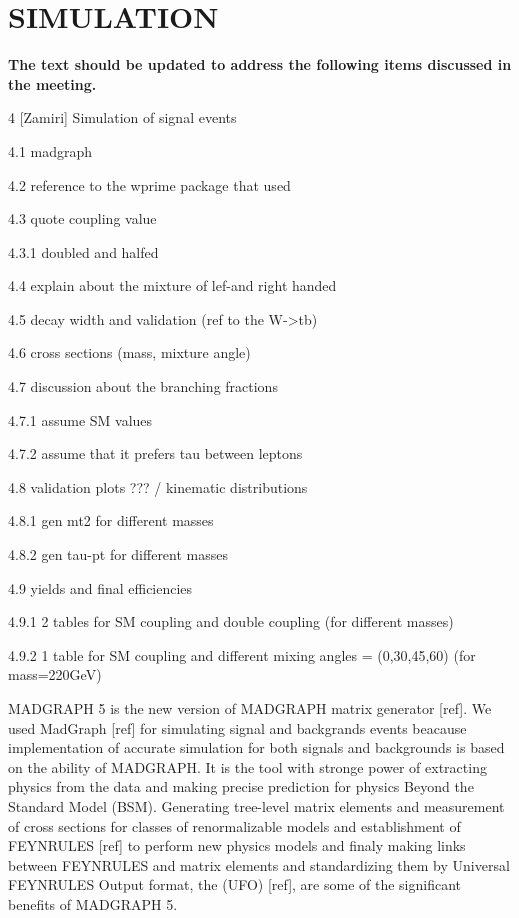 \section{SIMULATION}\label{sec:evo}

{\bf The text should be updated to address the following items discussed in the meeting.}

4 [Zamiri] Simulation of signal events

4.1 madgraph

4.2 reference to the wprime package that used

4.3 quote coupling value

4.3.1 doubled and halfed

4.4 explain about the mixture of lef-and right handed

4.5 decay width and validation (ref to the W->tb)

4.6 cross sections (mass, mixture angle)

4.7 discussion about the branching fractions

4.7.1 assume SM values

4.7.2 assume that it prefers tau between leptons

4.8 validation plots ??? / kinematic distributions

4.8.1 gen mt2 for different masses

4.8.2 gen tau-pt for different masses

4.9 yields and final efficiencies

4.9.1 2 tables for SM coupling and double coupling (for different masses)

4.9.2 1 table for SM coupling and different mixing angles = (0,30,45,60) (for mass=220GeV)



{\small MADGRAPH 5} is the new version of {\small MADGRAPH} matrix generator [ref]. We used MadGraph [ref] for simulating signal and backgrands events beacause implementation of accurate simulation for both signals and backgrounds is based on the ability of {\small MADGRAPH}. It is the tool with stronge power of extracting physics from the data and making precise prediction for physics Beyond the Standard Model {\small (BSM)}. Generating tree-level matrix elements and measurement of cross sections for classes of renormalizable models and establishment of {\small FEYNRULES} [ref] to perform new physics models and finaly making links between {\small FEYNRULES} and matrix elements and standardizing them by Universal F{\small EYNRULES} Output format, the {\small (UFO)} [ref], are some of the significant benefits of {\small MADGRAPH 5}.

